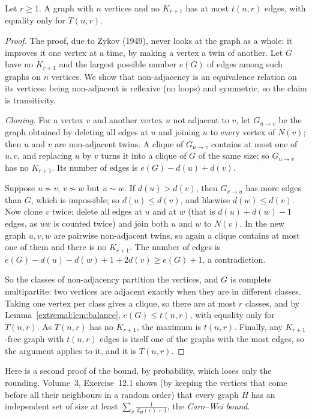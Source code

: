 \begin{theorem}[Tur\'an, 1941]\label{extremal:thm:turan}
Let $r\ge1$. A graph with $n$ vertices and no $K_{r+1}$ has at most $t(n,r)$ edges, with equality only for $T(n,r)$.
\end{theorem}
\begin{proof}
The proof, due to Zykov (1949), never looks at the graph as a whole: it improves it one vertex at a time, by making a vertex a twin of another.
Let $G$ have no $K_{r+1}$ and the largest possible number $e(G)$ of edges among such graphs on $n$ vertices. We show that non-adjacency is an
equivalence relation on its vertices: being non-adjacent is reflexive (no loops) and symmetric, so the claim is transitivity.

\emph{Cloning.} For a vertex $v$ and another vertex $u$ not adjacent to $v$, let $G_{u\to v}$ be the graph obtained by deleting all edges at $u$ and joining $u$ to
every vertex of $N(v)$; then $u$ and $v$ are non-adjacent twins. A clique of $G_{u\to v}$ contains at most one of $u,v$, and replacing $u$ by $v$ turns
it into a clique of $G$ of the same size; so $G_{u\to v}$ has no $K_{r+1}$. Its number of edges is $e(G)-d(u)+d(v)$.

Suppose $u\not\sim v$, $v\not\sim w$ but $u\sim w$. If $d(u)>d(v)$, then $G_{v\to u}$ has more edges than $G$, which is impossible; so $d(u)\le d(v)$, and likewise
$d(w)\le d(v)$. Now clone $v$ twice: delete all edges at $u$ and at $w$ (that is $d(u)+d(w)-1$ edges, as $uw$ is counted twice) and join both $u$ and $w$ to
$N(v)$. In the new graph $u,v,w$ are pairwise non-adjacent twins, so again a clique contains at most one of them and there is no $K_{r+1}$. The number of
edges is $e(G)-d(u)-d(w)+1+2d(v)\ge e(G)+1$, a contradiction.

So the classes of non-adjacency partition the vertices, and $G$ is complete multipartite: two vertices are adjacent exactly when they are in different classes.
Taking one vertex per class gives a clique, so there are at most $r$ classes, and by Lemma~\ref{extremal:lem:balance}, $e(G)\le t(n,r)$, with equality only for
$T(n,r)$. As $T(n,r)$ has no $K_{r+1}$, the maximum is $t(n,r)$. Finally, any $K_{r+1}$-free graph with $t(n,r)$ edges is itself one of the graphs with the most edges,
so the argument applies to it, and it is $T(n,r)$.
\end{proof}

Here is a second proof of the bound, by probability, which loses only the rounding. Volume~3, Exercise~12.1 shows (by keeping the vertices that come
before all their neighbours in a random order) that every graph $H$ has an independent set of size at least $\sum_v\frac1{d_H(v)+1}$, the
\emph{Caro--Wei bound}.


